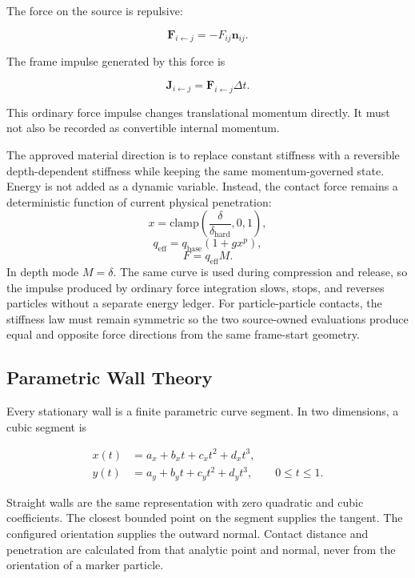 The force on the source is repulsive:

\begin{equation}
\mathbf F_{i\leftarrow j}=-F_{ij}\mathbf n_{ij}.
\end{equation}

The frame impulse generated by this force is

\begin{equation}
\mathbf J_{i\leftarrow j}=\mathbf F_{i\leftarrow j}\Delta t.
\end{equation}

This ordinary force impulse changes translational momentum directly.  It must
not also be recorded as convertible internal momentum.

The approved material direction is to replace constant stiffness with a
reversible depth-dependent stiffness while keeping the same momentum-governed
state.  Energy is not added as a dynamic variable.  Instead, the contact force
remains a deterministic function of current physical penetration:
\[
    x=\mathrm{clamp}
      \left(\frac{\delta}{\delta_{\mathrm{hard}}},0,1\right),
\]
\[
    q_{\mathrm{eff}} =
      q_{\mathrm{base}}\left(1+g x^p\right),
\]
\[
    F=q_{\mathrm{eff}}M.
\]
In depth mode \(M=\delta\).  The same curve is used during compression and
release, so the impulse produced by ordinary force integration slows, stops,
and reverses particles without a separate energy ledger.  For
particle-particle contacts, the stiffness law must remain symmetric so the
two source-owned evaluations produce equal and opposite force directions from
the same frame-start geometry.

\subsection{Parametric Wall Theory}

Every stationary wall is a finite parametric curve segment.  In two
dimensions, a cubic segment is

\begin{align}
x(t)&=a_x+b_xt+c_xt^2+d_xt^3,\\
y(t)&=a_y+b_yt+c_yt^2+d_yt^3,
\qquad 0\leq t\leq1.
\end{align}

Straight walls are the same representation with zero quadratic and cubic
coefficients.  The closest bounded point on the segment supplies the tangent.
The configured orientation supplies the outward normal.  Contact distance and
penetration are calculated from that analytic point and normal, never from the
orientation of a marker particle.

